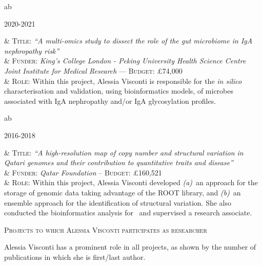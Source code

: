 \documentclass[a4paper,10pt]{article}
\newcommand{\smalltitle}[1]{
	\vspace{0.1cm}
	{\noindent 
	\large \textsc{#1}}
	\vspace{0.1cm}
}
\newenvironment{singletablelist}
{	\vspace{-0.2cm}
	\begin{longtable}[!h]{ab}}{\end{longtable}
}
\newcommand{\stlist}[2]{
	\hspace{-3cm}
	\noindent
	\begin{minipage}{0.24\textwidth}
	\begin{flushright}
	\textsc{#1}
	\end{flushright}
	\end{minipage}
	& #2\\[0.2cm]
}
\begin{document}
\begin{singletablelist}
	\stlist{2020-2021}{ 
		  \textsc{Title:} \emph{``A multi-omics study to dissect the role of the gut microbiome in IgA nephropathy risk''}\\
		& \textsc{Funder:} \emph{King's College London - Peking University Health Science Centre Joint Institute for Medical Research} --- \textsc{Budget:} £74,000 \\
		& \textsc{Role:}  Within this project, Alessia Visconti is responsible for the \emph{in silico} characterisation and validation, using bioinformatics models, of microbes associated with IgA nephropathy and/or IgA glycosylation profiles.
	}
	
\end{singletablelist}

\newpage
	
\begin{singletablelist}
		
	\stlist{2016-2018}{ 
		  \textsc{Title:} \emph{``A high-resolution map of copy number and structural variation in Qatari genomes and their contribution to quantitative traits and disease''}\\
		& \textsc{Funder:} \emph{Qatar Foundation} -- \textsc{Budget:} £160,521  \\
		& \textsc{Role:} Within this project, Alessia Visconti developed \emph{(a)}~an approach for the storage of genomic data taking advantage of the ROOT library, and \emph{(b)}~an ensemble approach for the identification of structural variation. She also conducted the bioinformatics analysis for~\cite{Ros21} and supervised a research associate.
	}
		
\end{singletablelist}


\smalltitle{Projects to which Alessia Visconti participates as researcher}

\noindent  Alessia Visconti has a prominent role in all projects, as shown by the number of publications in which she is first/last author.

\vspace{0.1cm}
\end{document}

